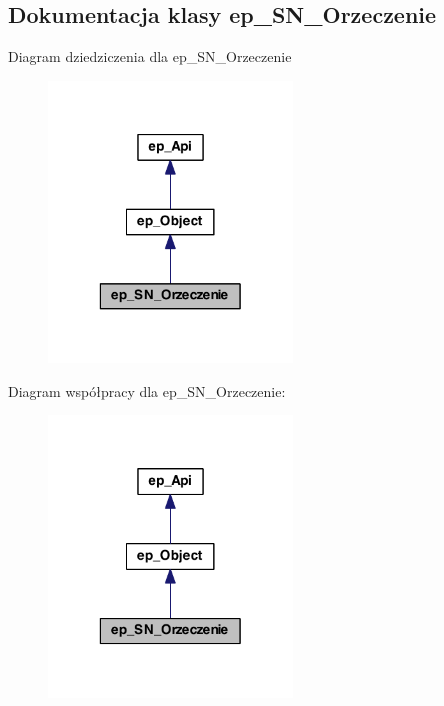 \hypertarget{classep___s_n___orzeczenie}{\subsection{Dokumentacja klasy ep\-\_\-\-S\-N\-\_\-\-Orzeczenie}
\label{classep___s_n___orzeczenie}
}


Diagram dziedziczenia dla ep\-\_\-\-S\-N\-\_\-\-Orzeczenie\nopagebreak
\begin{figure}[H]
\begin{center}
\leavevmode
\includegraphics[width=184pt]{classep___s_n___orzeczenie__inherit__graph}
\end{center}
\end{figure}


Diagram współpracy dla ep\-\_\-\-S\-N\-\_\-\-Orzeczenie\-:\nopagebreak
\begin{figure}[H]
\begin{center}
\leavevmode
\includegraphics[width=184pt]{classep___s_n___orzeczenie__coll__graph}
\end{center}
\end{figure}
